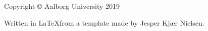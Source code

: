 \thispagestyle{empty}
{\small
\strut\vfill %
\noindent Copyright \copyright{} Aalborg University 2019\par
\vspace{0.2cm}
\noindent Written in \LaTeX  from a template made by Jesper Kjær Nielsen. 
}
\clearpage

